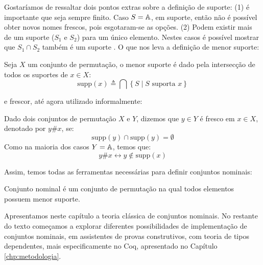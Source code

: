 Gostaríamos de ressaltar dois pontos extras sobre a definição de suporte: (1) é importante que seja sempre finito. Caso $S = \mathbb{A}$, em suporte, então não é possível obter novos nomes frescos, pois esgotaram-se as opções.
(2) Podem existir mais de um suporte ($S_1$ e $S_2$) para um único elemento. Nestes casos é possível mostrar que $S_1 \cap S_2$ também é um suporte \cite[Proposição 2.3]{Pitts2013}. O que nos leva a definição de menor suporte:
\begin{definicao}
	Seja $X$ um conjunto de permutação, o menor suporte é dado pela intersecção de todos os suportes de $x \in X$:
	\begin{equation}\label{eq:menor-suporte}
		\text{supp}(x) \triangleq \bigcap \left\{ S \mid S \text{ suporta } x \right\}
	\end{equation}	
\end{definicao}\noindent
e frescor, até agora utilizado informalmente:
\begin{definicao}[Frescor]
	Dado dois conjuntos de permutação $X$ e $Y$, dizemos que $y \in Y$ é fresco em $x \in X$, denotado por $y \# x$, se:
	\begin{equation}\label{eq:frescor-supp}
		\text{supp}(y) \cap \text{supp}(y) = \emptyset
	\end{equation}
	Como na maioria dos casos $Y = \mathbb{A}$, temos que:
	\begin{equation}\label{eq:frescor}
		y \# x \leftrightarrow y \notin \text{supp}(x)
	\end{equation}
\end{definicao}\noindent
Assim, temos todas as ferramentas necessárias para definir conjuntos nominais:
\begin{definicao}\label{def:conjunto-nominal}
	Conjunto nominal é um conjunto de permutação na qual todos elementos possuem menor suporte.
\end{definicao}

Apresentamos neste capítulo a teoria clássica de conjuntos nominais. No restante do texto começamos a explorar diferentes possibilidades de implementação de conjuntos nominais, em assistentes de provas construtivos, com teoria de tipos dependentes, mais especificamente no Coq, apresentado no Capítulo \ref{chp:metodologia}. 


